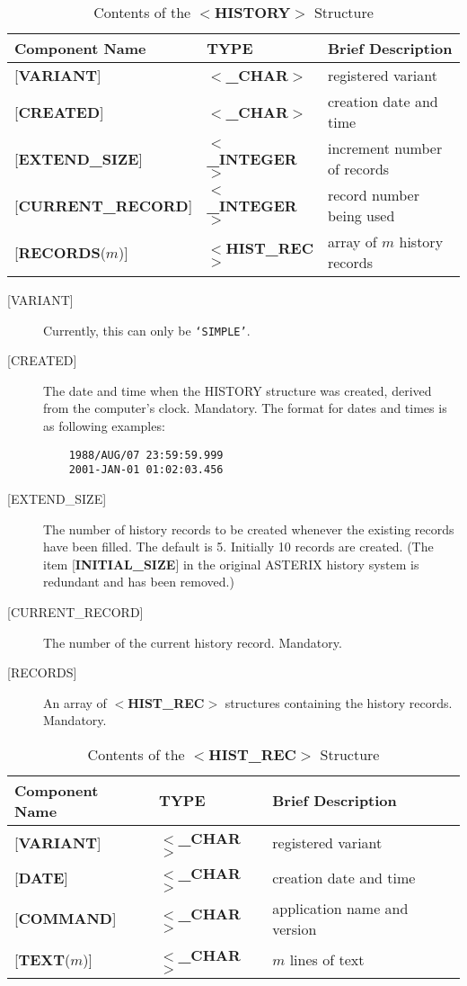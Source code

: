 \documentclass[twoside,11pt]{article}
\begin{document}
\begin{table}[htb]
\centering
\caption{Contents of the $<${\bf HISTORY}$>$ Structure}
\label{ta:history}
\begin{tabular}{|l|l|l|}
\hline
Component Name & TYPE & Brief Description \\ \hline
{[}{\bf VARIANT}{]} & $<${\bf \_CHAR}$>$ & registered variant \\
{[}{\bf CREATED}{]} & $<${\bf \_CHAR}$>$ & creation date and time \\
{[}{\bf EXTEND\_SIZE}{]} & $<${\bf \_INTEGER}$>$ & increment number of records \\
{[}{\bf CURRENT\_RECORD}{]} & $<${\bf \_INTEGER}$>$ & record number being used \\
{[}{\bf RECORDS}($m$){]} & $<${\bf HIST\_REC}$>$ & array of $m$ history records \\ \hline
\end{tabular}
\end{table}

\begin{description}
\item [{[}VARIANT{]}]
Currently, this can only be {\tt `SIMPLE'}.
\item [{[}CREATED{]}]
The date and time when the HISTORY structure was created,
derived from the computer's clock.  Mandatory.  The format for
dates and times is as following examples:
\begin{verbatim}
    1988/AUG/07 23:59:59.999
    2001-JAN-01 01:02:03.456
\end{verbatim}
\item [{[}EXTEND\_SIZE{]}]
The number of history records to be created whenever the existing
records have been filled.  The default is 5.
Initially 10 records are created.  (The item
{[}{\bf INITIAL\_SIZE}{]}
in the original ASTERIX history system is redundant and has been
removed.)
\item [{[}CURRENT\_RECORD{]}]
The number of the current history record.  Mandatory.
\item [{[}RECORDS{]}]  An array of $<${\bf HIST\_REC}$>$
structures containing the
history records.  Mandatory.
\end{description}

\begin{table}[htb]
\centering
\caption{Contents of the $<${\bf HIST\_REC}$>$ Structure}
\begin{tabular}{|l|l|l|}
\hline
Component Name & TYPE & Brief Description \\ \hline
{[}{\bf VARIANT}{]} & $<${\bf \_CHAR}$>$ & registered variant \\
{[}{\bf DATE}{]} & $<${\bf \_CHAR}$>$ & creation date and time \\
{[}{\bf COMMAND}{]} & $<${\bf \_CHAR}$>$ & application name
      and version \\
{[}{\bf TEXT}($m$){]} & $<${\bf \_CHAR}$>$ &
      $m$ lines of text \\ \hline
\end{tabular}
\end{table}
\end{document}
